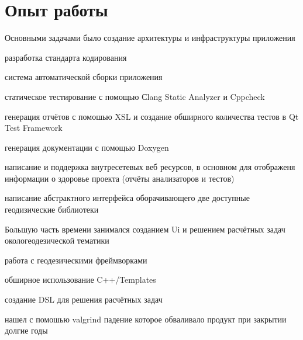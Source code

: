 \documentclass[a4paper]{curricula-vitae}
\begin{document}
\hfill
\begin{minipage}[t]{0.66\textwidth}%

\section{Опыт работы} 

Основными задачами было создание архитектуры и инфраструктуры приложения
\vspace{\topsep} %
\begin{tightitemize}
\item разработка стандарта кодирования
\item система автоматической сборки приложения
\item статическое тестирование с помощью Сlang Static Analyzer и Cppcheck
\item генерация отчётов с помошью XSL и создание обширного количества тестов в Qt Test Framework
\item генерация документации с помощью Doxygen
\item написание и поддержка внутресетевых веб ресурсов, в основном для отображеня
информации о здоровье проекта (отчёты анализаторов и тестов)
\item написание абстрактного интерфейса оборачивающего две доступные геодизические библиотеки
\end{tightitemize}

\insertspace

Большую часть времени занимался созданием Ui и
решением расчётных задач окологеодезической тематики
\begin{tightitemize}
\item работа с геодезическими фреймворками
\item обширное использование C++/Templates
\item создание DSL для решения расчётных задач
\item нашел с помошью valgrind падение которое обваливало продукт при закрытии долгие годы
\end{tightitemize}


\end{minipage}
\end{document}
